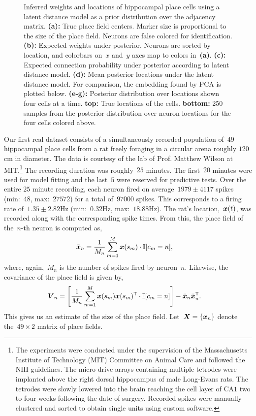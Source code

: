 \begin{figure}[t!]
\begin{center}
    \vspace{-3em}
  \end{center}
  \caption[Inferred weights and locations of hippocampal place cells]{ Inferred
    weights and locations of hippocampal place cells using a latent distance model
    as a prior distribution over the adjacency matrix.
    \textbf{(a):} True place field centers. Marker size is proportional to the size of the place field. Neurons are false colored for identification.
    \textbf{(b):} Expected weights under posterior. Neurons are sorted by location, and colorbars on~$x$ and~$y$ axes map to colors in~\textbf{(a)}.
    \textbf{(c):} Expected connection probability under posterior according to latent distance model.
    \textbf{(d):} Mean posterior locations under the latent distance model. For comparison, the embedding found by PCA is plotted below. 
    \textbf{(e-g): } Posterior distribution over locations shown four cells at a time.
    \textbf{top:} True locations of the cells. 
    \textbf{bottom:} 250 samples from the posterior
    distribution over neuron locations for the four cells colored above.
  }
  \label{fig:hawkes_hipp}
\end{figure}

Our first real dataset consists of a simultaneously recorded
population of~$49$ hippocampal place cells from a rat freely foraging
in a circular arena roughly $120$cm in diameter. The data is courtesy
of the lab of Prof. Matthew Wilson at MIT.\footnote{ The experiments
  were conducted under the supervision of the Massachusetts Institute
  of Technology (MIT) Committee on Animal Care and followed the NIH
  guidelines.  The micro-drive arrays containing multiple tetrodes
  were implanted above the right dorsal hippocampus of male Long-Evans
  rats. The tetrodes were slowly lowered into the brain reaching the
  cell layer of CA$1$ two to four weeks following the date of
  surgery. Recorded spikes were manually clustered and sorted to
  obtain single units using custom software.}  The recording duration
was roughly~$25$ minutes. The first~$20$ minutes were used for model
fitting and the last~$5$ were reserved for predictive tests. Over the
entire $25$ minute recording, each neuron fired on
average~$1979\pm4117$ spikes (min:~$48$, max:~$27572$) for a total
of~$97000$ spikes. This corresponds to a firing rate
of~$1.35 \pm 2.82$Hz (min:~$0.32$Hz, max:~$18.88$Hz). The rat's
location,~$\boldsymbol{x}(t)$, was recorded along with the corresponding spike
times. From this, the place field of the~$n$-th neuron is computed as,
\begin{align*}
  \bar{\boldsymbol{x}}_n &= \frac{1}{M_n} \sum_{m=1}^M \boldsymbol{x}(s_m) \cdot \mathbb{I}[c_m=n],
\end{align*}
where, again,~$M_n$ is the number of spikes fired by neuron~$n$. Likewise,
the covariance of the place field is given by,
\begin{align*}
  \boldsymbol{V}_n &= \left[ \frac{1}{M_n} \sum_{m=1}^M  \boldsymbol{x}(s_m) \boldsymbol{x}(s_m)^{\mathsf{T}}  \cdot \mathbb{I}[c_m = n] \right] - \bar{\boldsymbol{x}}_n \bar{\boldsymbol{x}}_n^{\mathsf{T}}.
\end{align*}
This gives us an estimate of the size of the place field. Let~${\boldsymbol{X}= \{\boldsymbol{x}_n\}}$
denote the~${49\times 2}$ matrix of place fields.

